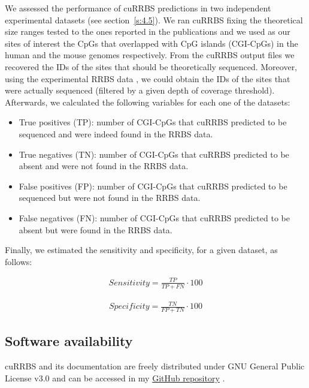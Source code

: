 We assessed the performance of cuRRBS predictions in two independent experimental datasets \cite{Tanas2017,Lim2016} (see section~\ref{s:4.5}). We ran cuRRBS fixing the theoretical size ranges tested to the ones reported in the publications \cite{Tanas2017,Lim2016} and we used as our sites of interest the CpGs that overlapped with CpG islands (CGI-CpGs) in the human \cite{Tanas2017} and the mouse genomes \cite{Lim2016} respectively. From the cuRRBS output files we recovered the IDs of the sites that should be theoretically sequenced. Moreover, using the experimental RRBS data \cite{Tanas2017,Lim2016}, we could obtain the IDs of the sites that were actually sequenced (filtered by a given depth of coverage threshold). Afterwards, we calculated the following variables for each one of the datasets:

\begin{itemize}
	
	\item True positives (TP): number of CGI-CpGs that cuRRBS predicted to be sequenced and were indeed found in the RRBS data.
	
	\item True negatives (TN): number of CGI-CpGs that cuRRBS predicted to be absent and were not found in the RRBS data.
	
	\item False positives (FP): number of CGI-CpGs that cuRRBS predicted to be sequenced but were not found in the RRBS data.
	
	\item False negatives (FN): number of CGI-CpGs that cuRRBS predicted to be absent but were found in the RRBS data.
	
\end{itemize}

Finally, we estimated the sensitivity and specificity, for a given dataset, as follows:

\begin{align}
Sensitivity = \frac{TP}{TP+FN} \cdot 100
\end{align}

\begin{align}
Specificity = \frac{TN}{FP+TN} \cdot 100
\end{align}

\subsection*{Software availability}

cuRRBS and its documentation are freely distributed under GNU General Public License v3.0 and can be accessed in my \href{https://github.com/demh/cuRRBS/}{GitHub repository} \cite{Martin-Herranz2017}.